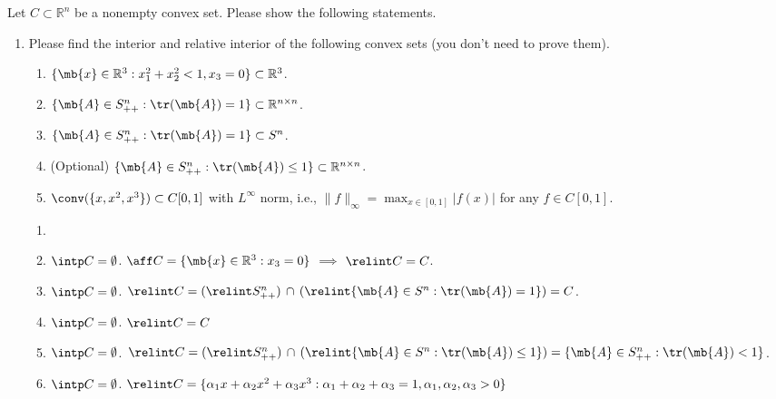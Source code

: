 \newcommand{\school}{\text{University of Science and Technology of China}}
\newcommand{\course}{\text{Introduction to Machine Learning}}
\newcommand{\semester}{\text{Fall 2022}}
\newcommand{\lecturer}{\text{Jie Wang}}
\newcommand{\posted}{\text{Oct. 25, 2022}}
\newcommand{\due}{\text{Nov. 8, 2022}}
\newcommand{\hwno}{\text{3}}
\newcommand{\name}{\text{Yunqin Zhu}}
\newcommand{\id}{\text{PB20061372}}


\maketitle


\begin{exercise}
  Let $C \subset \mathbb{R}^n$ be a nonempty convex set. Please show the following statements.
  \begin{enumerate}
    \item Please find the interior and relative interior of the following convex sets (you don't need to prove them).
      \begin{enumerate}
        \item $\{\mb{x}\in\mathbb{R}^3: x_1^2+x_2^2<1,x_3=0\}\subset\mathbb{R}^3$.
        \item $\{\mb{A}\in S_{++}^n: \tr(\mb{A})=1\}\subset \mathbb{R}^{n\times n}$.
        \item $\{\mb{A}\in S_{++}^n: \tr(\mb{A})=1\}\subset S^ n$.
        \item (Optional) $\{\mb{A}\in S_{++}^n: \tr(\mb{A})\le1\}\subset \mathbb{R}^{n\times n}$.
        \item $\conv (\{x, x^2, x^3\})\subset C[0,1]$ with $L^\infty$ norm, i.e., $\|f\|_\infty = \max_{x\in [0,1]}|f(x)|$ for any $f\in C[0,1]$.
      \end{enumerate}

      \begin{solution}
        \begin{enumerate}
          \item []
          \item $\intp C = \emptyset$. $\aff C = \{\mb{x}\in\mathbb{R}^3: x_3=0\}$ $\implies$ $\relint C = C$.
          \item $\intp C = \emptyset$. $\relint C = (\relint S_{++}^n)\,\cap \,(\relint \{\mb{A}\in S^n : \tr(\mb{A}) = 1 \}) = C$.
          \item $\intp C = \emptyset$. $\relint C = C$
          \item $\intp C = \emptyset$. $\relint C = (\relint S_{++}^n)\,\cap \,(\relint \{\mb{A}\in S^n : \tr(\mb{A}) \le 1 \}) = \{\mb{A}\in S_{++}^n: \tr(\mb{A})<1\}$.
          \item $\intp C = \emptyset$. $\relint C = \{\alpha_1x + \alpha_2x^2 + \alpha_3x^3 : \alpha_1 + \alpha_2 + \alpha_3 = 1, \alpha_1, \alpha_2, \alpha_3 > 0 \}$
            \qedhere
        \end{enumerate}
      \end{solution}


\end{enumerate}
\end{exercise}
